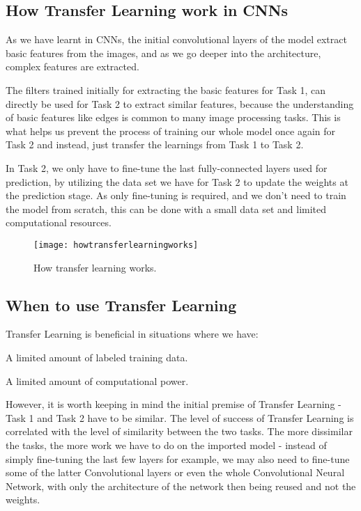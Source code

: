 	\subsection{How Transfer Learning work in CNNs}
	\begin{bulletedlist}
		\item As we have learnt in CNNs, the initial convolutional layers of the model extract basic features from the images, and as we go deeper into the architecture, complex features are extracted.
		\item The filters trained initially for extracting the basic features for Task 1, can directly be used for Task 2 to extract similar features, because the understanding of basic features like edges is common to many image processing tasks. This is what helps us prevent the process of training our whole model once again for Task 2 and instead, just transfer the learnings from Task 1 to Task 2.
		\item In Task 2, we only have to fine-tune the last fully-connected layers used for prediction, by utilizing the data set we have for Task 2 to update the weights at the prediction stage.  As only fine-tuning is required, and we don't need to train the model from scratch, this can be done with a small data set and limited computational resources.
	\end{bulletedlist}
	\begin{figure}[tbh]
		\centering
		\texttt{[image: howtransferlearningworks]}
		\caption[How transfer learning works]{How transfer learning works.}
		\label{fig:howtransferlearningworks}
	\end{figure}

	\subsection{When to use Transfer Learning}
	\begin{bulletedlist}
		\item Transfer Learning is beneficial in situations where we have:
		\begin{bulletedlist}
			\item A limited amount of labeled training data.
			\item A limited amount of computational power.
		\end{bulletedlist}
		\item However, it is worth keeping in mind the initial premise of Transfer Learning - Task 1 and Task 2 have to be similar.  The level of success of Transfer Learning is correlated with the level of similarity between the two tasks. The more dissimilar the tasks, the more work we have to do on the imported model - instead of simply fine-tuning the last few layers for example, we may also need
to fine-tune some of the latter Convolutional layers or even the whole Convolutional Neural Network, with only the architecture of the network then being reused and not the weights.
	\end{bulletedlist}

